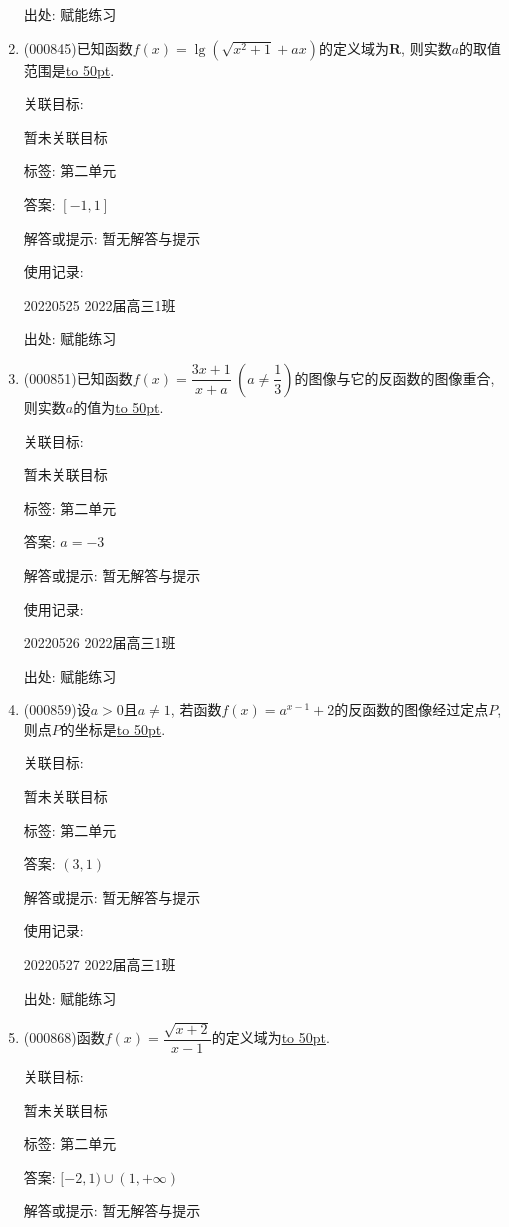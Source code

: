 \documentclass[10pt,a4paper]{article}
\newcommand{\blank}[1]{\underline{\hbox to #1pt{}}}
\begin{document}
\begin{enumerate}[1.]
出处: 赋能练习
\item { (000845)}已知函数$f(x)=\lg (\sqrt{x^2+1}+ax)$的定义域为$\mathbf{R}$, 则实数$a$的取值范围是\blank{50}.


关联目标:

暂未关联目标



标签: 第二单元

答案: $[-1, 1]$

解答或提示: 暂无解答与提示

使用记录:

20220525	2022届高三1班	


出处: 赋能练习
\item { (000851)}已知函数$f(x)=\dfrac{3x+1}{x+a}\ (a\ne \dfrac13)$的图像与它的反函数的图像重合, 则实数$a$的值为\blank{50}.


关联目标:

暂未关联目标



标签: 第二单元

答案: $a=-3$

解答或提示: 暂无解答与提示

使用记录:

20220526	2022届高三1班	


出处: 赋能练习
\item { (000859)}设$a>0$且$a\ne 1$, 若函数$f(x)=a^{x-1}+2$的反函数的图像经过定点$P$, 则点$P$的坐标是\blank{50}.


关联目标:

暂未关联目标



标签: 第二单元

答案: $(3,1)$

解答或提示: 暂无解答与提示

使用记录:

20220527	2022届高三1班	


出处: 赋能练习
\item { (000868)}函数$f(x)=\dfrac{\sqrt{x+2}}{x-1}$的定义域为\blank{50}.


关联目标:

暂未关联目标



标签: 第二单元

答案: $[-2,1)\cup (1,+\infty)$

解答或提示: 暂无解答与提示


\end{enumerate}
\end{document}
